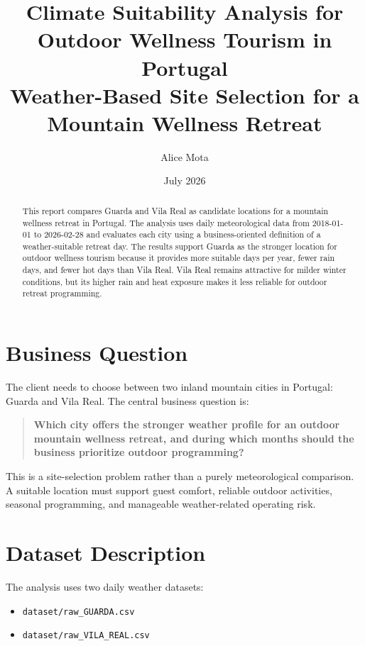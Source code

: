 \documentclass[11pt,a4paper]{article}
\title{\textbf{Climate Suitability Analysis for Outdoor Wellness Tourism in Portugal}\\
\large Weather-Based Site Selection for a Mountain Wellness Retreat}
\author{Alice Mota}
\date{July 2026}
\begin{document}
\maketitle

\begin{abstract}
This report compares Guarda and Vila Real as candidate locations for a mountain wellness retreat in Portugal. The analysis uses daily meteorological data from 2018-01-01 to 2026-02-28 and evaluates each city using a business-oriented definition of a weather-suitable retreat day. The results support Guarda as the stronger location for outdoor wellness tourism because it provides more suitable days per year, fewer rain days, and fewer hot days than Vila Real. Vila Real remains attractive for milder winter conditions, but its higher rain and heat exposure makes it less reliable for outdoor retreat programming.
\end{abstract}

\section{Business Question}

The client needs to choose between two inland mountain cities in Portugal: Guarda and Vila Real. The central business question is:

\begin{quote}
\textbf{Which city offers the stronger weather profile for an outdoor mountain wellness retreat, and during which months should the business prioritize outdoor programming?}
\end{quote}

This is a site-selection problem rather than a purely meteorological comparison. A suitable location must support guest comfort, reliable outdoor activities, seasonal programming, and manageable weather-related operating risk.

\section{Dataset Description}

The analysis uses two daily weather datasets:

\begin{itemize}[leftmargin=*]
    \item \texttt{dataset/raw\_GUARDA.csv}
    \item \texttt{dataset/raw\_VILA\_REAL.csv}
\end{itemize}
\end{document}
